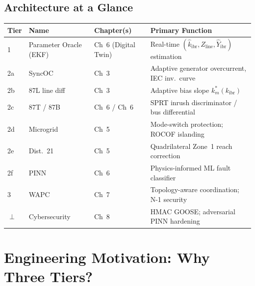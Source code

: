 \documentclass[12pt,a4paper]{article}
\newcommand{\kibr}{k_\mathrm{ibr}}
\newcommand{\kibrhat}{\hat{k}_\mathrm{ibr}}
\newcommand{\Zline}{\hat{Z}_\mathrm{line}}
\newcommand{\Yibr}{\hat{Y}_\mathrm{ibr}}
\newcommand{\km}{k_m}
\begin{document}
\subsection{Architecture at a Glance}

\begin{center}
\small
\begin{tabular}{@{}lllp{4.5cm}@{}}
\toprule
\textbf{Tier} & \textbf{Name} & \textbf{Chapter(s)} & \textbf{Primary Function} \\
\midrule
1 & Parameter Oracle (EKF)
  & Ch~6 (Digital Twin)
  & Real-time $(\kibrhat, \Zline, \Yibr)$ estimation \\
2a & SyncOC
  & Ch~3
  & Adaptive generator overcurrent, IEC inv.\ curve \\
2b & 87L line diff
  & Ch~3
  & Adaptive bias slope $\km^*(\kibr)$ \\
2c & 87T / 87B
  & Ch~6 / Ch~6
  & SPRT inrush discriminator / bus differential \\
2d & Microgrid
  & Ch~5
  & Mode-switch protection; ROCOF islanding \\
2e & Dist.~21
  & Ch~5
  & Quadrilateral Zone~1 reach correction \\
2f & PINN
  & Ch~6
  & Physics-informed ML fault classifier \\
3  & WAPC
  & Ch~7
  & Topology-aware coordination; N-1 security \\
$\perp$ & Cybersecurity
  & Ch~8
  & HMAC GOOSE; adversarial PINN hardening \\
\bottomrule
\end{tabular}
\end{center}

\section{Engineering Motivation: Why Three Tiers?}
\end{document}
